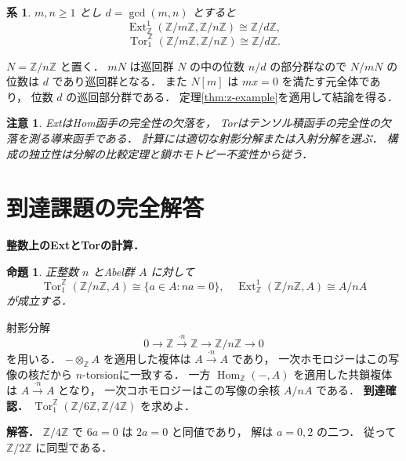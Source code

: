 \documentclass[a5paper,10pt,onecolumn]{jsarticle}
\makeatletter
\theoremstyle{mathnotetheorem}
\newtheorem{proposition}[theorem]{命題}
\newtheorem{corollary}[theorem]{系}
\newtheorem{remark}[theorem]{注意}
\renewcommand{\proofname}{証明}
\renewenvironment{proof}[1][\proofname]{%
  \par\pushQED{\qed}\normalfont\topsep4\p@\@plus2\p@\relax
  \trivlist\item[\hskip\labelsep\bfseries #1]\ignorespaces
}{\popQED\endtrivlist\@endpefalse}
\makeatother
\begin{document}
\begin{corollary}\label{cor:zn-example}
$m,n\ge1$ とし $d=\gcd(m,n)$ とすると
\[
 \operatorname{Ext}^1_{\mathbb Z}
 (\mathbb Z/m\mathbb Z,\mathbb Z/n\mathbb Z)
 \cong\mathbb Z/d\mathbb Z,
\]
\[
 \operatorname{Tor}^{\mathbb Z}_1
 (\mathbb Z/m\mathbb Z,\mathbb Z/n\mathbb Z)
 \cong\mathbb Z/d\mathbb Z.
\]
\end{corollary}
\begin{proof}
$N=\mathbb Z/n\mathbb Z$ と置く．
$mN$ は巡回群 $N$ の中の位数 $n/d$ の部分群なので
$N/mN$ の位数は $d$ であり巡回群となる．
また $N[m]$ は $mx=0$ を満たす元全体であり，
位数 $d$ の巡回部分群である．
定理\ref{thm:z-example}を適用して結論を得る．
\end{proof}

\begin{remark}
ExtはHom函手の完全性の欠落を，
Torはテンソル積函手の完全性の欠落を測る導来函手である．
計算には適切な射影分解または入射分解を選ぶ．
構成の独立性は分解の比較定理と鎖ホモトピー不変性から従う．
\end{remark}

\section{到達課題の完全解答}
\noindent\textbf{整数上のExtとTorの計算．}
\begin{proposition}
正整数 $n$ とAbel群 $A$ に対して
\[
\operatorname{Tor}_1^{\mathbb Z}(\mathbb Z/n\mathbb Z,A)
\cong\{a\in A:na=0\},
\quad
\operatorname{Ext}^1_{\mathbb Z}(\mathbb Z/n\mathbb Z,A)
\cong A/nA
\]
が成立する．
\end{proposition}
\begin{proof}
射影分解
\[
0\longrightarrow\mathbb Z
\xrightarrow{\cdot n}\mathbb Z
\longrightarrow\mathbb Z/n\mathbb Z
\longrightarrow0
\]
を用いる．
$-\otimes_{\mathbb Z}A$ を適用した複体は
$A\xrightarrow{\cdot n}A$ であり，
一次ホモロジーはこの写像の核だから
$n$-torsionに一致する．
一方 $\operatorname{Hom}_{\mathbb Z}(-,A)$
を適用した共鎖複体は
$A\xrightarrow{\cdot n}A$ となり，
一次コホモロジーはこの写像の余核 $A/nA$ である．
\end{proof}
\noindent\textbf{到達確認．}
$\operatorname{Tor}_1^{\mathbb Z}
(\mathbb Z/6\mathbb Z,\mathbb Z/4\mathbb Z)$
を求めよ．
\par\noindent\textbf{解答．}
$\mathbb Z/4\mathbb Z$ で $6a=0$ は
$2a=0$ と同値であり，
解は $a=0,2$ の二つ．
従って $\mathbb Z/2\mathbb Z$ に同型である．
\end{document}
